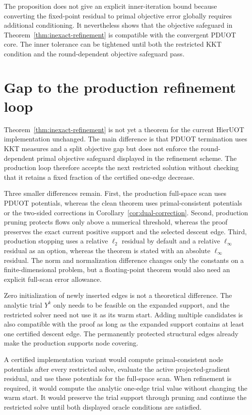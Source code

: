 \documentclass[11pt]{article}
\begin{document}
The proposition does not give an explicit inner-iteration bound because converting the fixed-point residual to primal objective error globally requires additional conditioning.
It nevertheless shows that the objective safeguard in Theorem~\ref{thm:inexact-refinement} is compatible with the convergent PDUOT core.
The inner tolerance can be tightened until both the restricted KKT condition and the round-dependent objective safeguard pass.

\section{Gap to the production refinement loop}

Theorem~\ref{thm:inexact-refinement} is not yet a theorem for the current HierUOT implementation unchanged.
The main difference is that PDUOT termination uses KKT measures and a split objective gap but does not enforce the round-dependent primal objective safeguard displayed in the refinement scheme.
The production loop therefore accepts the next restricted solution without checking that it retains a fixed fraction of the certified one-edge decrease.

Three smaller differences remain.
First, the production full-space scan uses PDUOT potentials, whereas the clean theorem uses primal-consistent potentials or the two-sided corrections in Corollary~\ref{cor:dual-correction}.
Second, production pruning protects flows only above a numerical threshold, whereas the proof preserves the exact current positive support and the selected descent edge.
Third, production stopping uses a relative $\ell_2$ residual by default and a relative $\ell_\infty$ residual as an option, whereas the theorem is stated with an absolute $\ell_\infty$ residual.
The norm and normalization difference changes only the constants on a finite-dimensional problem, but a floating-point theorem would also need an explicit full-scan error allowance.

Zero initialization of newly inserted edges is not a theoretical difference.
The analytic trial $Y^k$ only needs to be feasible on the expanded support, and the restricted solver need not use it as its warm start.
Adding multiple candidates is also compatible with the proof as long as the expanded support contains at least one certified descent edge.
The permanently protected structural edges already make the production supports node covering.

A certified implementation variant would compute primal-consistent node potentials after every restricted solve, evaluate the active projected-gradient residual, and use these potentials for the full-space scan.
When refinement is required, it would compute the analytic one-edge trial value without changing the warm start.
It would preserve the trial support through pruning and continue the restricted solve until both displayed oracle conditions are satisfied.
\end{document}
